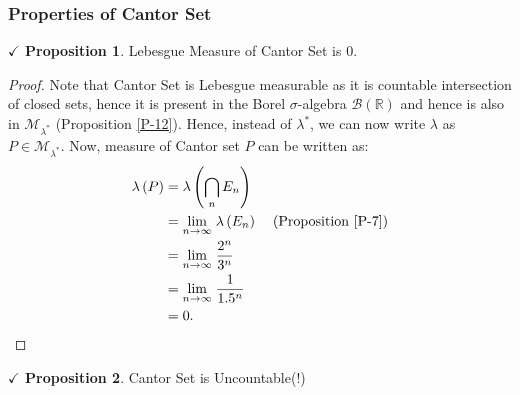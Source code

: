 \documentclass{article}
\theoremstyle{definition}
\theoremstyle{remark}
\theoremstyle{definition}
\theoremstyle{definition}
\newtheorem{proposition}{$\checkmark$ Proposition}
\theoremstyle{definition}
\newcommand{\bintrs}{\bigcap}
\newcommand{\R}{\mathbb{R}}
\newcommand{\bor}[1]{\mathscr{B}(#1)}
\newcommand{\limit}[2]{\underset{#1}{\lim}\; #2}
\newcommand{\set}[1]{\mathscr{#1}}
\newcommand{\msigm}[1]{\set{M}_{#1}}
\newcommand{\lm}[1]{\lambda\left (#1\right )}
\begin{document}
\subsubsection{Properties of Cantor Set}
\begin{proposition}
	Lebesgue Measure of Cantor Set is 0.
\end{proposition}
\begin{proof}
	Note that Cantor Set is Lebesgue measurable as it is countable intersection of closed sets, hence it is present in the Borel $ \sigma $-algebra $ \bor{\R} $ and hence is also in $ \msigm{\lambda^*} $ (Proposition \ref{P-12}). Hence, instead of $ \lambda^* $, we can now write $ \lambda $ as $ P\in \msigm{\lambda^*} $. Now, measure of Cantor set $ P $ can be written as:
	\begin{equation*}
		\begin{split}
			\lm{P} &= \lm{\bintrs_n E_n}\\
			&= \limit{n\to\infty}{\lm{E_n}}\;\;\;\;\text{(Proposition \ref{P-7})}\\
			&= \limit{n\to\infty}{\frac{2^n}{3^n}}\\
			&= \limit{n\to\infty}{\frac{1}{1.5^n}}\\
			&= 0.
		\end{split}
	\end{equation*}
\end{proof}
\hrulefill
\begin{proposition}
	Cantor Set is Uncountable(!)
\end{proposition}
\end{document}

